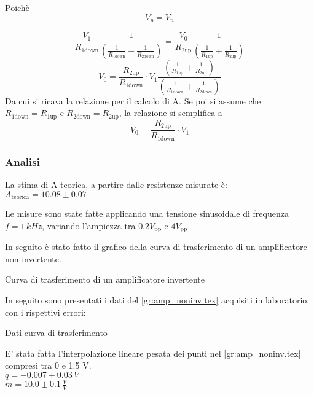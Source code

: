 Poichè 
$$V_p=V_n$$

$$\frac{V_1}{R_\textrm{1down}} \frac{1}{\left(\frac{1}{R_\textrm{1down}}+\frac{1}{R_\textrm{2down} }\right)}=\frac{V_0}{R_\textrm{2up}} \frac{1}{\left(\frac{1}{R_\textrm{1up}}+\frac{1}{R_\textrm{2up}} \right)}$$
$$V_0=\frac{R_\textrm{2up}}{R_\textrm{1down}} \cdot V_1 \frac{\left(\frac{1}{R_\textrm{1up}}+\frac{1}{R_\textrm{2up} }\right)}{\left(\frac{1}{R_\textrm{1down}}+\frac{1}{R_\textrm{2down}} \right)}$$
Da cui si ricava la relazione per il calcolo di A.
Se poi si assume che $R_\textrm{1down}=R_\textrm{1up}$ e $R_\textrm{2down}=R_\textrm{2up}$, la relazione si semplifica a 
$$V_0=\frac{R_\textrm{2up}}{R_\textrm{1down}} \cdot V_1$$
\subsubsection{Analisi}
La stima di A teorica, a partire dalle resistenze misurate è:\\
$A_\textrm{teorica}=10.08 \pm 0.07$ %

Le misure sono state fatte applicando una tensione sinusoidale di frequenza $ f=1 \,kHz$, variando l'ampiezza tra 
$0.2 V_\textrm{pp}$ e $4 V_\textrm{pp}$.

In seguito è stato fatto il grafico della curva di trasferimento di un amplificatore non invertente.

\begin{grafico} 
 \centering
 \resizebox{\textwidth}{!}{%
 
 }%
 \caption{Curva di trasferimento di un amplificatore invertente} 
 \label{gr:amp_noninv.tex} 
\end{grafico}

In seguito sono presentati i dati del  \autoref{gr:amp_noninv.tex} acquisiti in laboratorio, con i rispettivi errori:

\begin{tabella}
 \centering
 
 \caption{Dati curva di trasferimento}
 \label{tab:tab_non_inv.tex}
\end{tabella}
E' stata fatta l'interpolazione lineare pesata dei punti nel  \autoref{gr:amp_noninv.tex} compresi tra 0 e 1.5 V.\\
$q = -0.007 \pm 0.03 \, V$\\
$m = 10.0 \pm 0.1 \,\frac{V}{V}$


